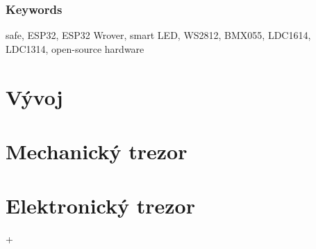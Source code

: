 \documentclass{template/socthesis}
\begin{document}
\subsection*{Keywords}
\color{black}
safe, ESP32, ESP32 Wrover, smart LED, WS2812, BMX055, LDC1614, \\ LDC1314, open-source hardware

\newpage
\pagestyle{plain}

\tableofcontents

\setcounter{figure}{0}
\setcounter{table}{0}
\newpage



\chapter{Vývoj}
\label{E-vyvoj}






%
%
%
%

\chapter{Mechanický trezor} 
\label{M3}


%
%

\newpage

\vspace{-50mm}

\chapter{Elektronický trezor}
\label{E4}


+
\newpage



\newpage

\newpage

\newpage

\newpage

\newpage

\end{document}
